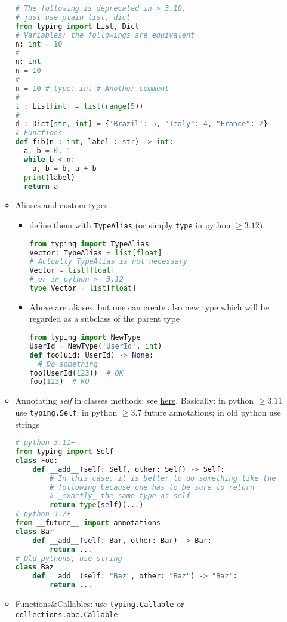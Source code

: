 \documentclass[a4paper,12pt,%
              final%
              ]{article}
\begin{document}
\begin{itemize}
\begin{itemize}
\begin{lstlisting}[language=python]
# The following is deprecated in > 3.10,
# just use plain list, dict
from typing import List, Dict
# Variables: the followings are equivalent
n: int = 10
#
n: int
n = 10
#
n = 10 # type: int # Another comment
#
l : List[int] = list(range(5))
#
d : Dict[str, int] = {'Brazil': 5, "Italy": 4, "France": 2}
# Functions
def fib(n : int, label : str) -> int:
  a, b = 0, 1
  while b < n:
    a, b = b, a + b
  print(label)
  return a
\end{lstlisting}
      \item Aliases and custom types:
        \begin{itemize}
          \item define them with \texttt{TypeAlias} (or simply \texttt{type} in python $\geq3.12$)
\begin{lstlisting}[language=python]
from typing import TypeAlias
Vector: TypeAlias = list[float]
# Actually TypeAlias is not necessary
Vector = list[float]
# or in python >= 3.12
type Vector = list[float]
\end{lstlisting}
          \item Above are aliases, but one can create also new type which will be regarded as a subclass of the parent type
\begin{lstlisting}[language=python]
from typing import NewType
UserId = NewType('UserId', int)
def foo(uid: UserId) -> None:
  # Do something
foo(UserId(123))  # OK
foo(123)  # KO
\end{lstlisting}
        \end{itemize}
      \item Annotating \emph{self} in classes methods: see \href{https://stackoverflow.com/a/33533514}{here}. Basically: in python $\geq3.11$ use \texttt{typing.Self}; in python $\geq3.7$ future annotations; in old python use strings
\begin{lstlisting}[language=python]
# python 3.11+
from typing import Self
class Foo:
    def __add__(self: Self, other: Self) -> Self:
        # In this case, it is better to do something like the
        # following because one has to be sure to return
        # _exactly_ the same type as self
        return type(self)(...)
# python 3.7+
from __future__ import annotations
class Bar
    def __add__(self: Bar, other: Bar) -> Bar:
        return ...
# Old pythons, use string
class Baz
    def __add__(self: "Baz", other: "Baz") -> "Baz":
        return ...
\end{lstlisting}
      \item Functions\&Callables: use \texttt{typing.Callable} or \texttt{collections.abc.Callable}

\end{itemize}
\end{itemize}
\end{document}
